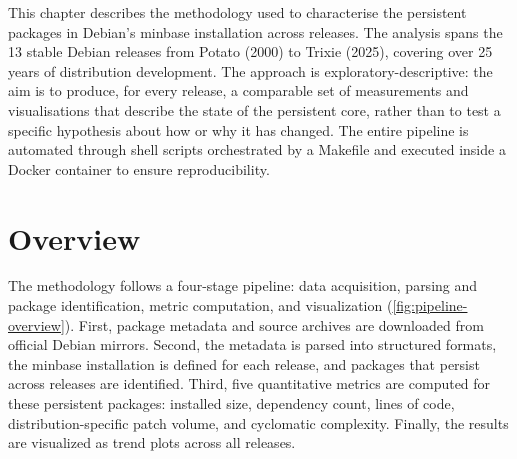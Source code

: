 This chapter describes the methodology used to characterise the persistent packages in Debian's minbase installation across releases. The analysis spans the 13 stable Debian releases from Potato (2000) to Trixie (2025), covering over 25 years of distribution development. The approach is exploratory-descriptive: the aim is to produce, for every release, a comparable set of measurements and visualisations that describe the state of the persistent core, rather than to test a specific hypothesis about how or why it has changed. The entire pipeline is automated through shell scripts orchestrated by a Makefile and executed inside a Docker container to ensure reproducibility.

\section{Overview}
\label{sec:method-overview}

The methodology follows a four-stage pipeline: data acquisition, parsing and package identification, metric computation, and visualization (\autoref{fig:pipeline-overview}). First, package metadata and source archives are downloaded from official Debian mirrors. Second, the metadata is parsed into structured formats, the minbase installation is defined for each release, and packages that persist across releases are identified. Third, five quantitative metrics are computed for these persistent packages: installed size, dependency count, lines of code, distribution-specific patch volume, and cyclomatic complexity. Finally, the results are visualized as trend plots across all releases.

